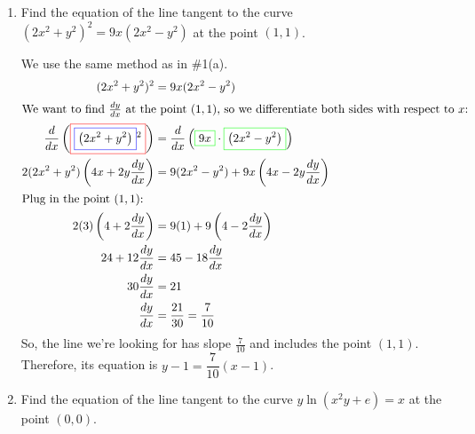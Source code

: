 \documentclass{article}
\begin{document}
\begin{enumerate}
  \item
\begin{problem}[\vfill\newpage]
      Find the equation of the line tangent to the curve $(2x^2 + y^2)^2 =
      9x (2x^2 - y^2)$ at the point $(1, 1)$.
    \end{problem}

    \begin{solution} 
      We use the same method as in {{{{\#1}}(a)}}.
      \begin{align*}
        (2x^2 + y^2)^2 &= 9x (2x^2 - y^2) \\
        \intertext{We want to find $\frac{dy}{dx}$ at the point $(1, 1)$,
          so we differentiate both sides with respect to $x$:} %
        \frac{d}{dx} \left(\fcolorbox{red}{white}{$\displaystyle
            \fcolorbox{blue}{white}{$\displaystyle \left(2 x^ { 2} + y^ {
                  2} \right)$}^ { 2} $}\right) &= \frac{d}{dx} \left(
          \fcolorbox{green}{white}{$\displaystyle 9x$}\cdot
          \fcolorbox{green}{white}{$\displaystyle \left(2 x^ { 2} -y^ {
                2} \right)$}\right) \\
        2 (2x^2 + y^2) \left(4x + 2y \frac{dy}{dx} \right) &= 9 (2x^2 -
        y^2) + 9x \left(4x - 2y \frac{dy}{dx} \right) \\
        \intertext{Plug in the point $(1, 1)$:} %
        2 (3) \left( 4 + 2 \frac{dy}{dx} \right) &= 9 (1) + 9 \left(4 -
          2\frac{dy}{dx} \right) \\
        24 + 12 \frac{dy}{dx} &= 45 - 18 \frac{dy}{dx} \\
        30 \frac{dy}{dx} &= 21 \\
        \frac{dy}{dx} &= \frac{21}{30} = \frac{7}{10}
      \end{align*}
      So, the line we're looking for has slope $\frac{7}{10}$ and includes
      the point $(1, 1)$.  Therefore, its equation is $\boxed{y - 1 =
        \dfrac{7}{10} (x - 1)}$.
    \end{solution}

  \item
\begin{problem}[\vfill]
      Find the equation of the line tangent to the curve $y \ln \left(x^2
        y+ e \right) = x$ at the point $(0, 0)$.
    \end{problem}


\end{enumerate}
\end{document}

